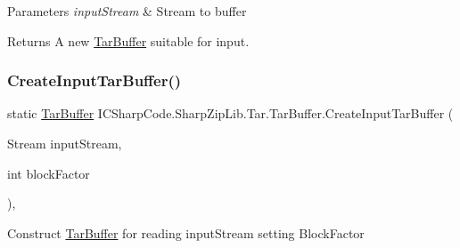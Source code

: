 \begin{DoxyParams}{Parameters}
{\em input\+Stream} & Stream to buffer\\
\hline
\end{DoxyParams}
\begin{DoxyReturn}{Returns}
A new \hyperlink{class_i_c_sharp_code_1_1_sharp_zip_lib_1_1_tar_1_1_tar_buffer}{Tar\+Buffer} suitable for input.
\end{DoxyReturn}
\mbox{\label{class_i_c_sharp_code_1_1_sharp_zip_lib_1_1_tar_1_1_tar_buffer_a9efbbf43f0a6a27db9962379db71ece4}} 
\subsubsection{\texorpdfstring{Create\+Input\+Tar\+Buffer()}{CreateInputTarBuffer()}\hspace{0.1cm}{\footnotesize\ttfamily [2/2]}}
{\footnotesize\ttfamily static \hyperlink{class_i_c_sharp_code_1_1_sharp_zip_lib_1_1_tar_1_1_tar_buffer}{Tar\+Buffer} I\+C\+Sharp\+Code.\+Sharp\+Zip\+Lib.\+Tar.\+Tar\+Buffer.\+Create\+Input\+Tar\+Buffer (\begin{DoxyParamCaption}\item[{Stream}]{input\+Stream,  }\item[{int}]{block\+Factor }\end{DoxyParamCaption})\hspace{0.3cm}{\ttfamily [inline]}, {\ttfamily [static]}}



Construct \hyperlink{class_i_c_sharp_code_1_1_sharp_zip_lib_1_1_tar_1_1_tar_buffer}{Tar\+Buffer} for reading input\+Stream setting Block\+Factor 


